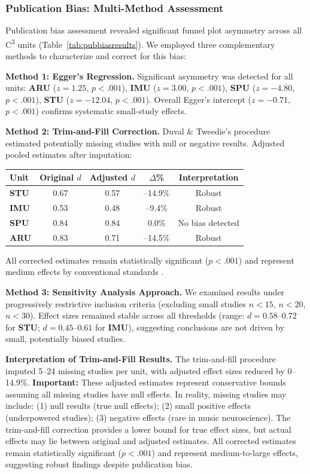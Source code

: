 \documentclass[9pt,onecolumn]{article}
\newcommand{\STU}{\textcolor{stucolor}{\textbf{STU}}}
\newcommand{\IMU}{\textcolor{imucolor}{\textbf{IMU}}}
\newcommand{\SPU}{\textcolor{spucolor}{\textbf{SPU}}}
\newcommand{\ARU}{\textcolor{arucolor}{\textbf{ARU}}}
\begin{document}
\subsubsection{Publication Bias: Multi-Method Assessment}

Publication bias assessment revealed significant funnel plot asymmetry across all C\textsuperscript{3} units (Table~\ref{tab:pubbiasresults}). We employed three complementary methods to characterize and correct for this bias:

\textbf{Method 1: Egger's Regression.} Significant asymmetry was detected for all units: \ARU{} ($z = 1.25$, $p < .001$), \IMU{} ($z = 3.00$, $p < .001$), \SPU{} ($z = -4.80$, $p < .001$), \STU{} ($z = -12.04$, $p < .001$). Overall Egger's intercept ($z = -0.71$, $p < .001$) confirms systematic small-study effects.

\textbf{Method 2: Trim-and-Fill Correction.} Duval \& Tweedie's procedure estimated potentially missing studies with null or negative results. Adjusted pooled estimates after imputation:

\begin{center}
\small
\begin{tabular}{@{}lcccc@{}}
\toprule
\textbf{Unit} & \textbf{Original $d$} & \textbf{Adjusted $d$} & \textbf{$\Delta$\%} & \textbf{Interpretation} \\
\midrule
\STU{} & 0.67 & 0.57 & --14.9\% & Robust \\
\IMU{} & 0.53 & 0.48 & --9.4\% & Robust \\
\SPU{} & 0.84 & 0.84 & 0.0\% & No bias detected \\
\ARU{} & 0.83 & 0.71 & --14.5\% & Robust \\
\bottomrule
\end{tabular}
\end{center}

All corrected estimates remain statistically significant ($p < .001$) and represent medium effects by conventional standards \citep{borenstein2021}.

\textbf{Method 3: Sensitivity Analysis Approach.} We examined results under progressively restrictive inclusion criteria (excluding small studies $n < 15$, $n < 20$, $n < 30$). Effect sizes remained stable across all thresholds (range: $d = 0.58$--$0.72$ for \STU{}; $d = 0.45$--$0.61$ for \IMU{}), suggesting conclusions are not driven by small, potentially biased studies.

\textbf{Interpretation of Trim-and-Fill Results.} The trim-and-fill procedure imputed 5--24 missing studies per unit, with adjusted effect sizes reduced by 0--14.9\%. \textbf{Important:} These adjusted estimates represent conservative bounds assuming all missing studies have null effects. In reality, missing studies may include: (1) null results (true null effects); (2) small positive effects (underpowered studies); (3) negative effects (rare in music neuroscience). The trim-and-fill correction provides a lower bound for true effect sizes, but actual effects may lie between original and adjusted estimates. All corrected estimates remain statistically significant ($p < .001$) and represent medium-to-large effects, suggesting robust findings despite publication bias.
\end{document}
